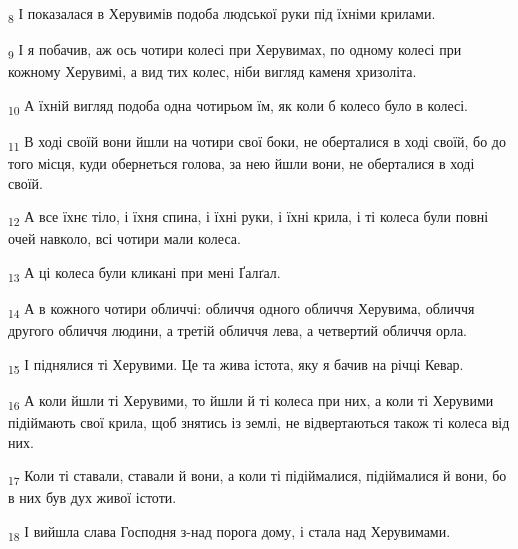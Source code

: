 \begin{tcolorbox}
\textsubscript{8} І показалася в Херувимів подоба людської руки під їхніми крилами.
\end{tcolorbox}
\begin{tcolorbox}
\textsubscript{9} І я побачив, аж ось чотири колесі при Херувимах, по одному колесі при кожному Херувимі, а вид тих колес, ніби вигляд каменя хризоліта.
\end{tcolorbox}
\begin{tcolorbox}
\textsubscript{10} А їхній вигляд подоба одна чотирьом їм, як коли б колесо було в колесі.
\end{tcolorbox}
\begin{tcolorbox}
\textsubscript{11} В ході своїй вони йшли на чотири свої боки, не оберталися в ході своїй, бо до того місця, куди обернеться голова, за нею йшли вони, не оберталися в ході своїй.
\end{tcolorbox}
\begin{tcolorbox}
\textsubscript{12} А все їхнє тіло, і їхня спина, і їхні руки, і їхні крила, і ті колеса були повні очей навколо, всі чотири мали колеса.
\end{tcolorbox}
\begin{tcolorbox}
\textsubscript{13} А ці колеса були кликані при мені Ґалґал.
\end{tcolorbox}
\begin{tcolorbox}
\textsubscript{14} А в кожного чотири обличчі: обличчя одного обличчя Херувима, обличчя другого обличчя людини, а третій обличчя лева, а четвертий обличчя орла.
\end{tcolorbox}
\begin{tcolorbox}
\textsubscript{15} І піднялися ті Херувими. Це та жива істота, яку я бачив на річці Кевар.
\end{tcolorbox}
\begin{tcolorbox}
\textsubscript{16} А коли йшли ті Херувими, то йшли й ті колеса при них, а коли ті Херувими підіймають свої крила, щоб знятись із землі, не відвертаються також ті колеса від них.
\end{tcolorbox}
\begin{tcolorbox}
\textsubscript{17} Коли ті ставали, ставали й вони, а коли ті підіймалися, підіймалися й вони, бо в них був дух живої істоти.
\end{tcolorbox}
\begin{tcolorbox}
\textsubscript{18} І вийшла слава Господня з-над порога дому, і стала над Херувимами.
\end{tcolorbox}
